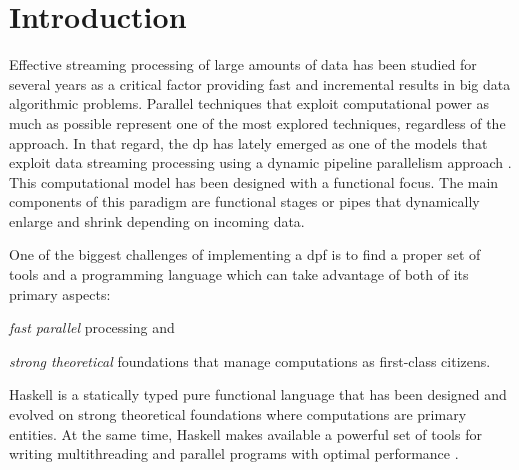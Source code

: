 \section{Introduction}\label{intro}
Effective streaming processing of large amounts of data has been studied for several years \cite{exploiting, onthefly}  as a critical factor providing fast and incremental results in big data algorithmic problems. 
Parallel techniques that exploit computational power as much as possible represent one of the most explored techniques, regardless of the approach.
In that regard, the \acrfull{dp} \cite{dpdef} has lately emerged as one of the models that exploit data streaming processing using a dynamic pipeline parallelism approach \cite{onthefly}. 
This computational model has been designed with a functional focus. The main components of this paradigm are functional stages or pipes that dynamically enlarge and shrink depending on incoming data.  

One of the biggest challenges of implementing a \acrfull{dpf} is to find a proper set of tools and a programming language which can take advantage of both of its primary aspects: \begin{inparaenum}[i\upshape)]
\item  \emph{fast parallel} processing and 
\item  \emph{strong theoretical} foundations that manage computations as first-class citizens.
 \end{inparaenum}
Haskell is a statically typed pure functional language that has been designed and evolved on strong theoretical foundations where computations are primary entities. At the same time, Haskell makes available a powerful set of tools for writing multithreading and parallel programs with optimal performance \cite{parallelbook, monadpar}.

